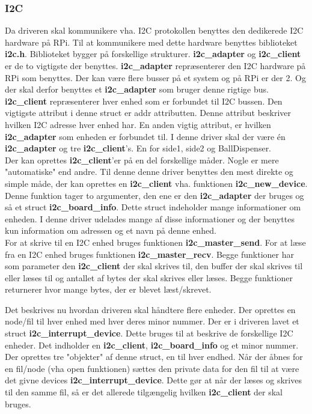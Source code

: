 \documentclass[Softwaredesign/Softwaredesign_main.tex]{subfiles}
\begin{document}
\subsubsection{I2C}
Da driveren skal kommunikere vha. I2C protokollen benyttes den dedikerede I2C hardware på RPi. Til at kommunikere med dette hardware benyttes biblioteket \textbf{i2c.h}. Biblioteket bygger på forskellige strukturer. \textbf{i2c\_adapter} og\textbf{ i2c\_client} er de to vigtigste der benyttes. 
\textbf{i2c\_adapter} repræsenterer den I2C hardware på RPi som benyttes. Der kan være flere busser på et system og på RPi er der 2. Og der skal derfor benyttes et \textbf{i2c\_adapter} som bruger denne rigtige bus. 
\textbf{i2c\_client} repræsenterer hver enhed som er forbundet til I2C bussen. Den vigtigste attribut i denne struct er addr attributten. Denne attribut beskriver hvilken I2C adresse hver enhed har. En anden vigtig attribut, er hvilken \textbf{i2c\_adapter} som enheden er forbundet til.
I denne driver skal der være én \textbf{i2c\_adapter} og tre \textbf{i2c\_client}'s. En for side1, side2 og BallDispenser. \\
Der kan oprettes \textbf{i2c\_client}'er på en del forskellige måder. Nogle er mere "automatiske" end andre. Til denne denne driver benyttes den mest direkte og simple måde, der kan oprettes en \textbf{i2c\_client} vha. funktionen \textbf{i2c\_new\_device}. Denne funktion tager to argumenter, den ene er den \textbf{i2c\_adapter} der bruges og så et struct \textbf{i2c\_board\_info}. Dette struct indeholder mange informationer om enheden. I denne driver udelades mange af disse informationer og der benyttes kun information om adressen og et navn på denne enhed.\\
For at skrive til en I2C enhed bruges funktionen \textbf{i2c\_master\_send}. For at læse fra en I2C enhed bruges funktionen \textbf{i2c\_master\_recv}. Begge funktioner har som parameter den\textbf{ i2c\_client} der skal skrives til, den buffer der skal skrives til eller læses til og antallet af bytes der skal skrives eller læses. Begge funktioner returnerer hvor mange bytes, der er blevet læst/skrevet.

Det beskrives nu hvordan driveren skal håndtere flere enheder. Der oprettes en node/fil til hver enhed med hver deres minor nummer.
Der er i driveren lavet et struct \textbf{i2c\_interrupt\_device}. Dette bruges til at beskrive de forskellige I2C enheder. Det indholder en \textbf{i2c\_client}, \textbf{i2c\_board\_info} og et minor nummer. Der oprettes tre "objekter" af denne struct, en til hver endhed. Når der åbnes for en fil/node (vha open funktionen) sættes den private data for den fil til at være det givne devices \textbf{i2c\_interrupt\_device}. Dette gør at når der læses og skrives til den samme fil, så er det allerede tilgængelig hvilken \textbf{i2c\_client} der skal bruges.
\end{document}
